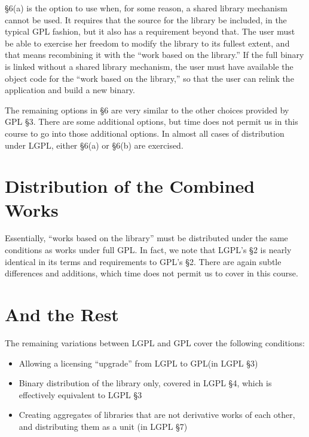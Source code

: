 \S 6(a) is the option to use when, for some reason, a shared library
mechanism cannot be used. It requires that the source for the library be
included, in the typical GPL fashion, but it also has a requirement beyond
that. The user must be able to exercise her freedom to modify the library
to its fullest extent, and that means recombining it with the ``work based
on the library.''  If the full binary is linked without a shared library
mechanism, the user must have available the object code for the ``work
based on the library,'' so that the user can relink the application and
build a new binary.

The remaining options in \S 6 are very similar to the other choices
provided by GPL \S 3. There are some additional options, but time does
not permit us in this course to go into those additional options. In
almost all cases of distribution under LGPL, either \S 6(a) or \S 6(b) are
exercised.

\section{Distribution of the Combined Works}

Essentially, ``works based on the library'' must be distributed under the
same conditions as works under full GPL\@. In fact, we note that LGPL's
\S 2 is nearly identical in its terms and requirements to GPL's \S 2.
There are again subtle differences and additions, which time does not
permit us to cover in this course.

\section{And the Rest}

The remaining variations between LGPL and GPL cover the following
conditions:

\begin{itemize}

\item Allowing a licensing ``upgrade'' from LGPL to GPL\@ (in LGPL \S 3)

\item Binary distribution of the library only, covered in LGPL \S 4,
  which is effectively equivalent to LGPL \S 3

\item Creating aggregates of libraries that are not derivative works of
  each other, and distributing them as a unit (in LGPL \S 7)

\end{itemize}


